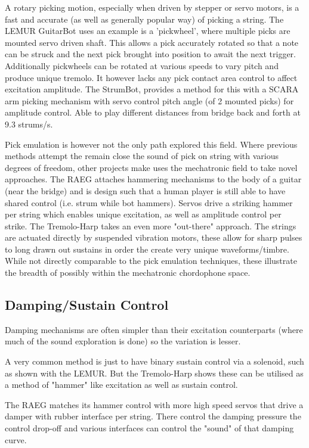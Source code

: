 \documentclass[11pt]{article}
\begin{document}
A rotary picking motion, especially when driven by stepper or servo motors, is a fast and accurate (as well as generally popular way) of picking a string. The LEMUR GuitarBot\cite{singer} uses an example is a 'pickwheel', where multiple picks are mounted servo driven shaft. This allows a pick accurately rotated so that a note can be struck and the next
pick brought into position to await the next trigger. Additionally pickwheels can be rotated at various speeds to vary pitch and produce unique tremolo.
It however lacks any pick contact area control to affect excitation amplitude. The StrumBot\cite{strumbot}, provides a method for this with a SCARA arm picking mechanism with servo control pitch angle (of 2 mounted picks) for amplitude control. Able to play different distances from bridge back and forth at 9.3 strums/s. 


Pick emulation is however not the only path explored this field. Where previous methods attempt the remain close the sound of pick on string with various degrees of freedom, other projects make uses the mechatronic field to take novel approaches.
The RAEG\cite{hammer} attaches hammering mechanisms to the body of a guitar (near the bridge) and is design such that a human player is still able to have shared control (i.e. strum while bot hammers). Servos drive a striking hammer per string which enables unique excitation, as well as amplitude control per strike.
The Tremolo-Harp\cite{vibe_harp} takes an even more "out-there" approach. The strings are actuated directly by suspended vibration motors, these allow for sharp pulses to long drawn out sustains in order the create very unique waveforms/timbre. 
While not directly comparable to the pick emulation techniques, these illustrate the breadth of possibly within the mechatronic chordophone space.

\subsection{Damping/Sustain Control}
Damping mechanisms are often simpler than their excitation counterparts (where much of the sound exploration is done) so the variation is lesser. 

A very common method is just to have binary sustain control via a solenoid, such as shown with the LEMUR\cite{singer}. But the Tremolo-Harp\cite{vibe_harp} shows these can be utilised as a method of "hammer" like excitation as well as sustain control. 

The RAEG\cite{hammer} matches its hammer control with more high speed servos that drive a damper with rubber interface per string. There control the damping pressure the control drop-off and various interfaces can control the "sound" of that damping curve.  
\end{document}
